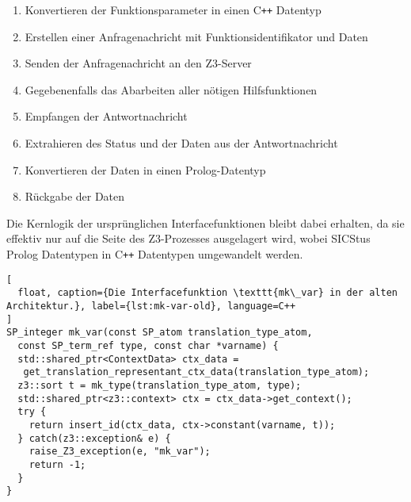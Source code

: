 \begin{enumerate}
  \item Konvertieren der Funktionsparameter in einen C\texttt{++} Datentyp
  \item Erstellen einer Anfragenachricht mit Funktionsidentifikator und Daten
  \item Senden der Anfragenachricht an den Z3-Server
  \item Gegebenenfalls das Abarbeiten aller nötigen Hilfsfunktionen
  \item Empfangen der Antwortnachricht
  \item Extrahieren des Status und der Daten aus der Antwortnachricht
  \item Konvertieren der Daten in einen Prolog-Datentyp
  \item Rückgabe der Daten
\end{enumerate}

Die Kernlogik der ursprünglichen Interfacefunktionen bleibt dabei erhalten, da sie effektiv nur auf die Seite des Z3-Prozesses ausgelagert wird,
wobei SICStus Prolog Datentypen in C\texttt{++} Datentypen umgewandelt werden.

\begin{lstlisting}[
  float, caption={Die Interfacefunktion \texttt{mk\_var} in der alten Architektur.}, label={lst:mk-var-old}, language=C++
]
SP_integer mk_var(const SP_atom translation_type_atom,
  const SP_term_ref type, const char *varname) {
  std::shared_ptr<ContextData> ctx_data =
   get_translation_representant_ctx_data(translation_type_atom);
  z3::sort t = mk_type(translation_type_atom, type);
  std::shared_ptr<z3::context> ctx = ctx_data->get_context();
  try {
    return insert_id(ctx_data, ctx->constant(varname, t));
  } catch(z3::exception& e) {
    raise_Z3_exception(e, "mk_var");
    return -1;
  }
}
\end{lstlisting}

